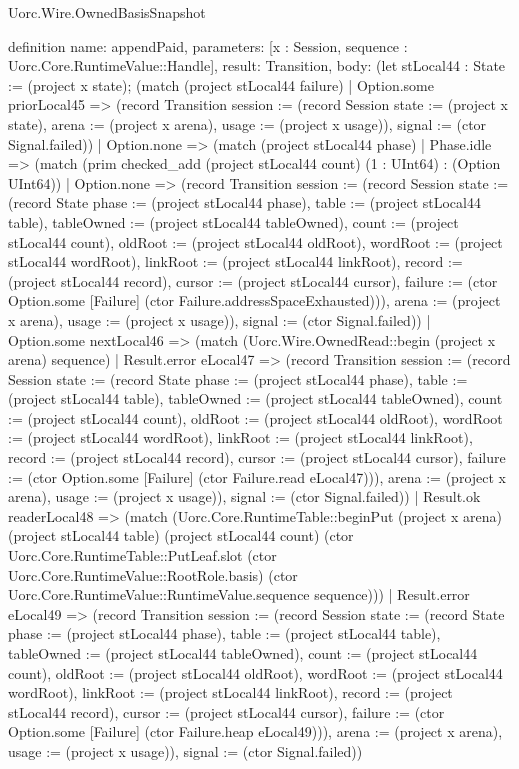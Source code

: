 \begin{lexlean}{Uorc.Wire.OwnedBasisSnapshot}
\begin{semanticmodule}
definition{
  name: appendPaid,
  parameters: [x : Session, sequence : Uorc.Core.RuntimeValue::Handle],
  result: Transition,
  body: (let stLocal44 : State := (project x state); (match (project stLocal44 failure)
    | Option.some priorLocal45 => (record Transition {session := (record Session {state := (project x state), arena := (project x arena), usage := (project x usage)}), signal := (ctor Signal.failed)})
    | Option.none => (match (project stLocal44 phase)
      | Phase.idle => (match (prim checked_add (project stLocal44 count) (1 : UInt64) : (Option UInt64))
        | Option.none => (record Transition {session := (record Session {state := (record State {phase := (project stLocal44 phase), table := (project stLocal44 table), tableOwned := (project stLocal44 tableOwned), count := (project stLocal44 count), oldRoot := (project stLocal44 oldRoot), wordRoot := (project stLocal44 wordRoot), linkRoot := (project stLocal44 linkRoot), record := (project stLocal44 record), cursor := (project stLocal44 cursor), failure := (ctor Option.some [Failure] (ctor Failure.addressSpaceExhausted))}), arena := (project x arena), usage := (project x usage)}), signal := (ctor Signal.failed)})
        | Option.some nextLocal46 => (match (Uorc.Wire.OwnedRead::begin (project x arena) sequence)
          | Result.error eLocal47 => (record Transition {session := (record Session {state := (record State {phase := (project stLocal44 phase), table := (project stLocal44 table), tableOwned := (project stLocal44 tableOwned), count := (project stLocal44 count), oldRoot := (project stLocal44 oldRoot), wordRoot := (project stLocal44 wordRoot), linkRoot := (project stLocal44 linkRoot), record := (project stLocal44 record), cursor := (project stLocal44 cursor), failure := (ctor Option.some [Failure] (ctor Failure.read eLocal47))}), arena := (project x arena), usage := (project x usage)}), signal := (ctor Signal.failed)})
          | Result.ok readerLocal48 => (match (Uorc.Core.RuntimeTable::beginPut (project x arena) (project stLocal44 table) (project stLocal44 count) (ctor Uorc.Core.RuntimeTable::PutLeaf.slot (ctor Uorc.Core.RuntimeValue::RootRole.basis) (ctor Uorc.Core.RuntimeValue::RuntimeValue.sequence sequence)))
            | Result.error eLocal49 => (record Transition {session := (record Session {state := (record State {phase := (project stLocal44 phase), table := (project stLocal44 table), tableOwned := (project stLocal44 tableOwned), count := (project stLocal44 count), oldRoot := (project stLocal44 oldRoot), wordRoot := (project stLocal44 wordRoot), linkRoot := (project stLocal44 linkRoot), record := (project stLocal44 record), cursor := (project stLocal44 cursor), failure := (ctor Option.some [Failure] (ctor Failure.heap eLocal49))}), arena := (project x arena), usage := (project x usage)}), signal := (ctor Signal.failed)})
}
\end{semanticmodule}
\end{lexlean}
